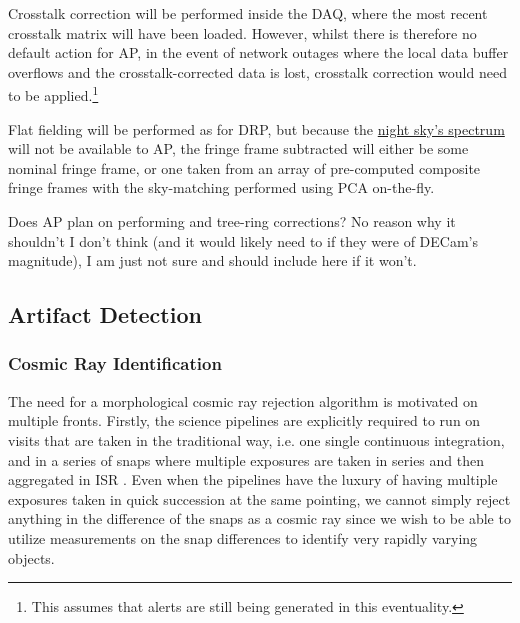 Crosstalk correction will be performed inside the DAQ, where the most recent crosstalk matrix will have been loaded. However, whilst there is therefore no default action for AP, in the event of network outages where the local data buffer overflows and the crosstalk-corrected data is lost, crosstalk correction would need to be applied.\footnote{ This assumes that alerts are still being generated in this eventuality.}

Flat fielding will be performed as for DRP, but because the \hyperref[sec:CPP:aux:nightSkySpectrum]{night sky's spectrum} will not be available to AP, the fringe frame subtracted will either be some nominal fringe frame, or one taken from an array of pre-computed composite fringe frames with the sky-matching performed using PCA on-the-fly.





\begin{note}
	Does AP plan on performing \bfeffect and tree-ring corrections? No reason why it shouldn't I don't think (and it would likely need to if they were of DECam's magnitude), I am just not sure and should include here if it won't.
\end{note}





\subsection{Artifact Detection}
\label{sec:acArtifactDetection}

\subsubsection{Cosmic Ray Identification}
\label{sec:acCosmicRayDetection}
The need for a morphological cosmic ray rejection algorithm is motivated on multiple fronts.  Firstly, the science pipelines are explicitly required to run on visits that are taken in the traditional way, i.e. one single continuous integration, and in a series of snaps where multiple exposures are taken in series and then aggregated in ISR .  Even when the pipelines have the luxury of having multiple exposures taken in quick succession at the same pointing, we cannot simply reject anything in the difference of the snaps as a cosmic ray since we wish to be able to utilize measurements on the snap differences to identify very rapidly varying objects.

